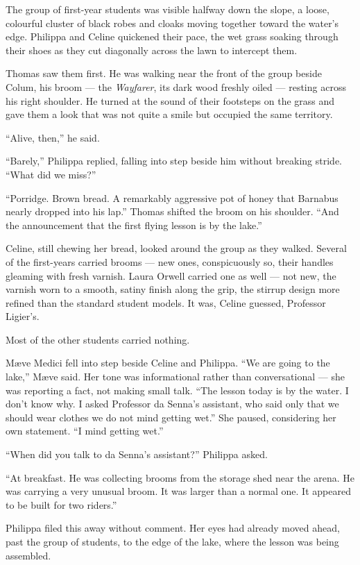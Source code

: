 The group of first-year students was visible halfway down the slope, a loose, colourful cluster of black robes and cloaks moving together toward the water's edge. Philippa and Celine quickened their pace, the wet grass soaking through their shoes as they cut diagonally across the lawn to intercept them.
 
Thomas saw them first. He was walking near the front of the group beside Colum, his broom --- the \textit{Wayfarer}, its dark wood freshly oiled --- resting across his right shoulder. He turned at the sound of their footsteps on the grass and gave them a look that was not quite a smile but occupied the same territory.
 
\enquote{Alive, then,} he said.
 
\enquote{Barely,} Philippa replied, falling into step beside him without breaking stride. \enquote{What did we miss?}
 
\enquote{Porridge. Brown bread. A remarkably aggressive pot of honey that Barnabus nearly dropped into his lap.} Thomas shifted the broom on his shoulder. \enquote{And the announcement that the first flying lesson is by the lake.}
 
Celine, still chewing her bread, looked around the group as they walked. Several of the first-years carried brooms --- new ones, conspicuously so, their handles gleaming with fresh varnish. Laura Orwell carried one as well --- not new, the varnish worn to a smooth, satiny finish along the grip, the stirrup design more refined than the standard student models. It was, Celine guessed, Professor Ligier's.
 
Most of the other students carried nothing.
 
Mæve Medici fell into step beside Celine and Philippa. \enquote{We are going to the lake,} Mæve said. Her tone was informational rather than conversational --- she was reporting a fact, not making small talk. \enquote{The lesson today is by the water. I don't know why. I asked Professor da Senna's assistant, who said only that we should wear clothes we do not mind getting wet.} She paused, considering her own statement. \enquote{I mind getting wet.}
 
\enquote{When did you talk to da Senna's assistant?} Philippa asked.
 
\enquote{At breakfast. He was collecting brooms from the storage shed near the arena. He was carrying a very unusual broom. It was larger than a normal one. It appeared to be built for two riders.}
 
Philippa filed this away without comment. Her eyes had already moved ahead, past the group of students, to the edge of the lake, where the lesson was being assembled.
 
